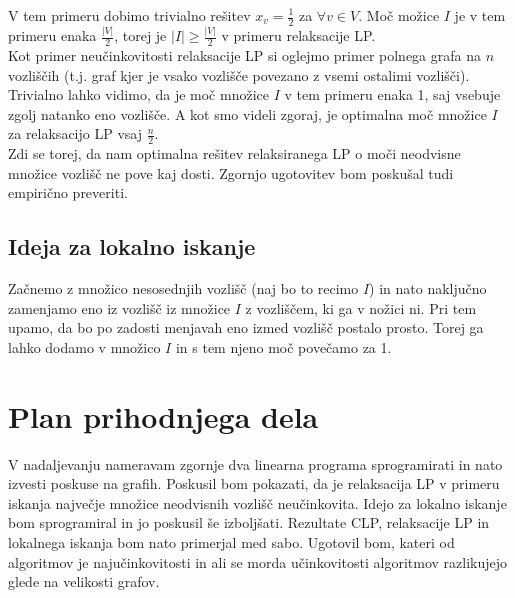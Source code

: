 \documentclass[a4paper, 12 pt]{article}
\theoremstyle{plain}
\theoremstyle{definition}
\theoremstyle{remark}
\begin{document}
V tem primeru dobimo trivialno rešitev $x_v = \frac{1}{2}$ za $\forall v \in V$. Moč možice $I$ je v tem primeru enaka $\frac{|V|}{2}$, torej je  $|I| \geq \frac{|V|}{2}$ v primeru relaksacije LP. \\

Kot primer neučinkovitosti relaksacije LP si oglejmo primer polnega grafa na $n$ vozliščih (t.j. graf kjer je vsako vozlišče povezano z vsemi ostalimi vozlišči). Trivialno lahko vidimo, da je moč množice $I$ v tem primeru enaka 1, saj vsebuje zgolj natanko eno vozlišče. A kot smo videli zgoraj, je optimalna moč množice $I$ za relaksacijo LP vsaj $\frac{n}{2}$.\\

Zdi se torej, da nam optimalna rešitev relaksiranega LP o moči neodvisne množice vozlišč ne pove kaj dosti. Zgornjo ugotovitev bom poskušal tudi empirično preveriti.




\subsection{Ideja za lokalno iskanje}
Začnemo z množico nesosednjih vozlišč (naj bo to recimo $I$) in nato naključno zamenjamo eno iz vozlišč iz množice $I$ z vozliščem, ki ga v nožici ni. Pri tem upamo, da bo po zadosti menjavah eno izmed vozlišč postalo prosto. Torej ga lahko dodamo v množico $I$ in s tem njeno moč povečamo za 1.




\section{Plan prihodnjega dela}

V nadaljevanju nameravam zgornje dva linearna programa sprogramirati in nato izvesti poskuse na grafih. Poskusil bom pokazati, da je relaksacija LP v primeru iskanja največje množice neodvisnih vozlišč neučinkovita. Idejo za lokalno iskanje bom sprogramiral in jo poskusil še izboljšati. Rezultate CLP, relaksacije LP in lokalnega iskanja bom nato primerjal med sabo. Ugotovil bom, kateri od algoritmov je najučinkovitosti in ali se morda učinkovitosti algoritmov razlikujejo glede na velikosti grafov.
\end{document}
